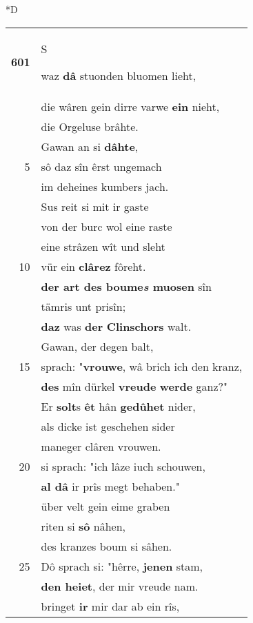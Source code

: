 \documentclass[8pt,a4paper,notitlepage]{article}
\begin{document}
\begin{table}[ht]
\begin{minipage}[t]{0.5\linewidth}
\small
\begin{center}*D
\end{center}
\begin{tabular}{rl}
\textbf{601} & \begin{large}S\end{large}waz \textbf{dâ} stuonden bluomen lieht,\\ 
 & die wâren gein dirre varwe \textbf{ein} nieht,\\ 
 & die Orgeluse brâhte.\\ 
 & Gawan an si \textbf{dâhte},\\ 
5 & sô daz sîn êrst ungemach\\ 
 & im deheines kumbers jach.\\ 
 & Sus reit si mit ir gaste\\ 
 & von der burc wol eine raste\\ 
 & eine strâzen wît und sleht\\ 
10 & vür ein \textbf{clârez} fôreht.\\ 
 & \textbf{der art des boume\textit{s} muosen} sîn\\ 
 & tämris unt prisîn;\\ 
 & \textbf{daz} was \textbf{der} \textbf{Clinschors} walt.\\ 
 & Gawan, der degen balt,\\ 
15 & sprach: "\textbf{vrouwe}, wâ brich ich den kranz,\\ 
 & \textbf{des} mîn dürkel \textbf{vreude} \textbf{werde} ganz?"\\ 
 & Er \textbf{solt}s \textbf{êt} hân \textbf{gedûhet} nider,\\ 
 & als dicke ist geschehen sider\\ 
 & maneger clâren vrouwen.\\ 
20 & si sprach: "ich lâze iuch schouwen,\\ 
 & \textbf{al dâ} ir prîs megt behaben."\\ 
 & über velt gein eime graben\\ 
 & riten si \textbf{sô} nâhen,\\ 
 & des kranzes boum si sâhen.\\ 
25 & Dô sprach si: "hêrre, \textbf{jenen} stam,\\ 
 & \textbf{den heiet}, der mir vreude nam.\\ 
 & bringet \textbf{ir} mir dar ab ein rîs,\\ 

\end{tabular}
\end{minipage}
\end{table}
\end{document}
